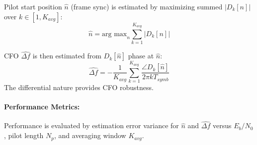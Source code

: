 \documentclass[11pt]{article}
\begin{document}
	Pilot start position $\hat{n}$ (frame sync) is estimated by maximizing summed $|D_k[n]|$ over $k \in [1, K_{avg}]$:
	\begin{equation}
		\hat{n} = \text{arg max}_n \sum_{k=1}^{K_{avg}} |D_k[n]|
		\label{eq:frame_sync_est_style_change}
	\end{equation}
	
	CFO $\hat{\Delta f}$ is then estimated from $D_k[\hat{n}]$ phase at $\hat{n}$:
	\begin{equation}
		\hat{\Delta f} = -\frac{1}{K_{avg}} \sum_{k=1}^{K_{avg}} \frac{\angle D_k[\hat{n}]}{2\pi k T_{symb}}
		\label{eq:cfo_est_diff_corr_style_change}
	\end{equation}
	The differential nature provides CFO robustness.
	
	\paragraph{Performance Metrics:}
	Performance is evaluated by estimation error variance for $\hat{n}$ and $\hat{\Delta f}$ versus $E_b/N_0$, pilot length $N_p$, and averaging window $K_{avg}$.
	
\end{document}
